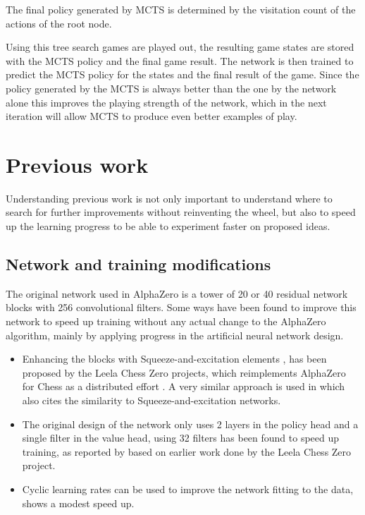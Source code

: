 \documentclass[12pt,onecolumn,oneside,titlepage]{article}
\begin{document}
The final policy generated by MCTS is determined by the visitation count of the actions of the root node.

Using this tree search games are played out, the resulting game states are stored with the MCTS policy and the final game result. The network is then trained to predict the MCTS policy for the states and the final result of the game.
Since the policy generated by the MCTS is always better than the one by the network alone this improves the playing strength of the network, which in the next iteration will allow MCTS to produce even better examples of play.

\section{Previous work}

Understanding previous work is not only important to understand where to search for further improvements without reinventing the wheel, but also to speed up the learning progress to be able to experiment faster on proposed ideas.

\subsection{Network and training modifications}

The original network used in AlphaZero is a tower of 20 or 40 residual network blocks with 256 convolutional filters. Some ways have been found to improve this network to speed up training without any actual change to the AlphaZero algorithm, mainly by applying progress in the artificial neural network design.

\begin{itemize}
 \item Enhancing the blocks with Squeeze-and-excitation elements \cite{hu2018squeeze}, has been proposed by the Leela Chess Zero projects, which reimplements AlphaZero for Chess as a distributed effort \cite{leela0sq}.
       A very similar approach is used in \cite{wu2019accelerating} which also cites the similarity to Squeeze-and-excitation networks.
 \item The original design of the network only uses 2 layers in the policy head and a single filter in the value head, using 32 filters has been found to speed up training, as reported by \cite{oracledevs6} based on earlier work done by the Leela Chess Zero project.
 \item Cyclic learning rates can be used to improve the network fitting to the data, \cite{oracledevs6} shows a modest speed up.
\end{itemize}
\end{document}
